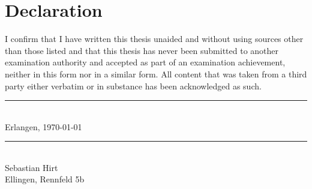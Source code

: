 \chapter*{Declaration}
\thispagestyle{empty}

\noindent
I confirm that I have written this thesis unaided and without using sources other than those listed and that this thesis has never been submitted to another examination authority and accepted as part of an examination achievement, neither in this form nor in a similar form.
All content that was taken from a third party either verbatim or in substance has been acknowledged as such.

\vspace{3cm}

\begin{minipage}[t]{0.45\textwidth}
    \rule{\textwidth}{0.5pt}\\
	Erlangen, \today
\end{minipage}
\hfill
\begin{minipage}[t]{0.45\textwidth}
	\rule{\textwidth}{0.5pt}\\
	Sebastian Hirt\\
    Ellingen, Rennfeld 5b
\end{minipage}
